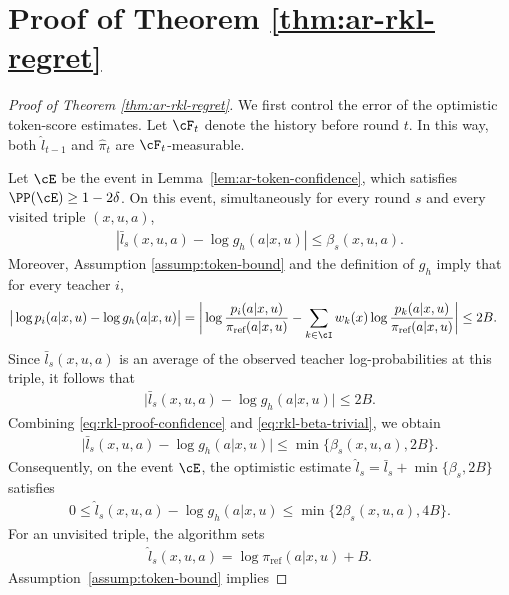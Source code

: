 \documentclass[11pt]{article}
\newcommand{\piref}{\pi_{\text{ref}}}
\begin{document}
\section{Proof of Theorem \ref{thm:ar-rkl-regret}}
\label{sec:proof-rkl-thm}
\begin{proof}[Proof of Theorem \ref{thm:ar-rkl-regret}]
We first control the error of the optimistic token-score estimates. Let $\cF_t$ denote the history before round $t$. In this way, both $\hat l_{t-1}$ and $\hat\pi_t$ are $\cF_t$-measurable.

Let $\cE$ be the event in Lemma~\ref{lem:ar-token-confidence}, which
satisfies $\PP(\cE)\geq1-2\delta$. On this event, simultaneously for
every round $s$ and every visited triple $(x,u,a)$,
\begin{align}
    \left|
        \bar l_s(x,u,a)-\log g_h(a|x,u)
    \right|
    \leq \beta_s(x,u,a).
    \label{eq:rkl-proof-confidence}
\end{align}
Moreover, Assumption \ref{assump:token-bound} and the definition of $g_h$ imply that for every
teacher $i$,
\begin{align*}
    \big|
        \log p_i(a|x,u)-\log g_h(a|x,u)
    \big|
    &=
    \bigg|
        \log\frac{p_i(a|x,u)}{\piref(a|x,u)}
        -
        \sum_{k\in\cI}w_k(x)
        \log\frac{p_k(a|x,u)}{\piref(a|x,u)}
    \bigg|
    \leq2B.
\end{align*}
Since $\bar l_s(x,u,a)$ is an average of the observed teacher
log-probabilities at this triple, it follows that
\begin{align}
\label{eq:rkl-beta-trivial}
    \big|
        \bar l_s(x,u,a)-\log g_h(a|x,u)
    \big|
    \leq2B.
\end{align}
Combining 
\eqref{eq:rkl-proof-confidence} and \eqref{eq:rkl-beta-trivial}, we obtain
\begin{align*}
    \big|
        \bar l_s(x,u,a)-\log g_h(a|x,u)
    \big|
    \leq\min\big\{\beta_s(x,u,a),2B\big\}.
\end{align*}
Consequently, on the event $\cE$, the optimistic estimate
$\hat l_s=\bar l_s+\min\{\beta_s,2B\}$ satisfies
\begin{align*}
    0
    \leq
    \hat l_s(x,u,a)-\log g_h(a|x,u)
    \leq
    \min\big\{2\beta_s(x,u,a),4B\big\}.
\end{align*}
For an unvisited triple, the algorithm sets
\begin{align*}
    \hat l_s(x,u,a)
    =
    \log\piref(a|x,u)+B.
\end{align*}
Assumption~\ref{assump:token-bound} implies

\end{proof}
\end{document}
